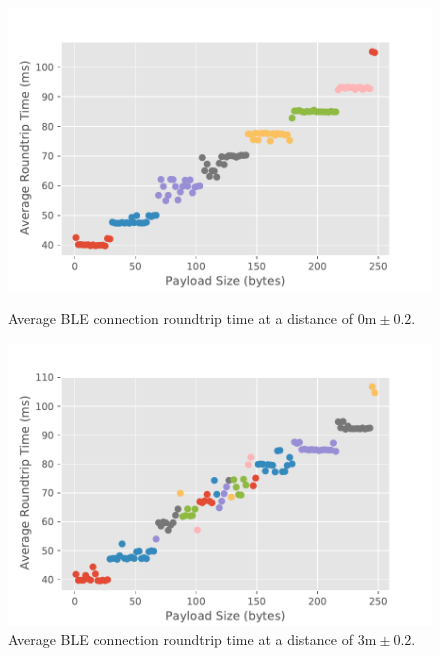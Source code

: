 \begin{figure}[H]
    \begin{minipage}[r]{0.49\linewidth}
    \centering
    \includegraphics[width=\linewidth]{images/ble-roundtrip-hci0-0cm.pdf}
    \caption[Average \acs{BLE} connection roundtrip time at a distance of 0m.]{Average \acs{BLE} connection roundtrip time at a distance of $0\text{m} \pm 0.2$.}
    \label{fig:ble-roundtrip-6cm}
    \end{minipage}
    \begin{minipage}[l]{0.49\linewidth}
        \centering
        \includegraphics[width=\linewidth]{images/ble-roundtrip-hci0-300cm.pdf}
        \caption[Average \acs{BLE} connection roundtrip time at a distance of 3m.]{Average \acs{BLE} connection roundtrip time at a distance of $3\text{m} \pm 0.2$.}
        \label{fig:ble-roundtrip-9cm}
        \end{minipage}
\end{figure}


